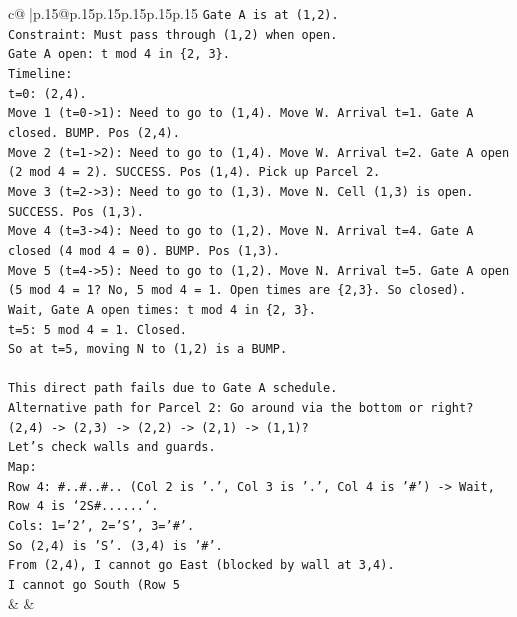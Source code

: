 \documentclass{article}
\begin{document}
{\begin{supertabular}{c@{$\;$}|p{.15\linewidth}@{}p{.15\linewidth}p{.15\linewidth}p{.15\linewidth}p{.15\linewidth}p{.15\linewidth}}
{{{\texttt{Gate A is at (1,2).} \\
\texttt{Constraint: Must pass through (1,2) when open.} \\
\texttt{Gate A open: t mod 4 in \{2, 3\}.} \\
\texttt{Timeline:} \\
\texttt{t=0: (2,4).} \\
\texttt{Move 1 (t=0{-}>1): Need to go to (1,4). Move W. Arrival t=1. Gate A closed. BUMP. Pos (2,4).} \\
\texttt{Move 2 (t=1{-}>2): Need to go to (1,4). Move W. Arrival t=2. Gate A open (2 mod 4 = 2). SUCCESS. Pos (1,4). Pick up Parcel 2.} \\
\texttt{Move 3 (t=2{-}>3): Need to go to (1,3). Move N. Cell (1,3) is open. SUCCESS. Pos (1,3).} \\
\texttt{Move 4 (t=3{-}>4): Need to go to (1,2). Move N. Arrival t=4. Gate A closed (4 mod 4 = 0). BUMP. Pos (1,3).} \\
\texttt{Move 5 (t=4{-}>5): Need to go to (1,2). Move N. Arrival t=5. Gate A open (5 mod 4 = 1? No, 5 mod 4 = 1. Open times are \{2,3\}. So closed).} \\
\texttt{Wait, Gate A open times: t mod 4 in \{2, 3\}.} \\
\texttt{t=5: 5 mod 4 = 1. Closed.} \\
\texttt{So at t=5, moving N to (1,2) is a BUMP.} \\
\\ 
\texttt{This direct path fails due to Gate A schedule.} \\
\texttt{Alternative path for Parcel 2: Go around via the bottom or right?} \\
\texttt{(2,4) {-}> (2,3) {-}> (2,2) {-}> (2,1) {-}> (1,1)?} \\
\texttt{Let's check walls and guards.} \\
\texttt{Map:} \\
\texttt{Row 4: \#..\#..\#.. (Col 2 is '.', Col 3 is '.', Col 4 is '\#') {-}> Wait, Row 4 is `2S\#......`.} \\
\texttt{Cols: 1='2', 2='S', 3='\#'.} \\
\texttt{So (2,4) is 'S'. (3,4) is '\#'.} \\
\texttt{From (2,4), I cannot go East (blocked by wall at 3,4).} \\
\texttt{I cannot go South (Row 5} \\
            }
        }
    }
    & & \\ \\


\end{supertabular}}
\end{document}
